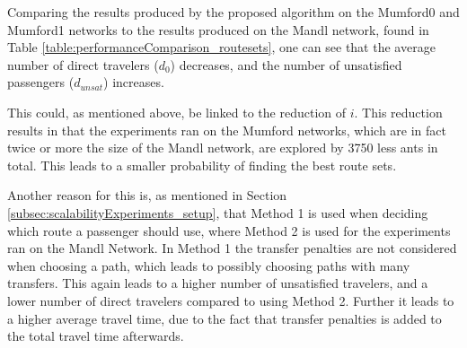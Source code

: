 Comparing the results produced by the proposed algorithm on the Mumford0 and Mumford1 networks to the results produced on the Mandl network, found in Table \vref{table:performanceComparison_routesets}, one can see that the average number of direct travelers ($d_0$) decreases, and the number of unsatisfied passengers ($d_{unsat}$) increases. 

This could, as mentioned above, be linked to the reduction of $i$. This reduction results in that the experiments ran on the Mumford networks, which are in fact twice or more the size of the Mandl network, are explored by 3750 less ants in total. This leads to a smaller probability of finding the best route sets.

Another reason for this is, as mentioned in Section \vref{subsec:scalabilityExperiments_setup}, that Method 1 is used when deciding which route a passenger should use, where Method 2 is used for the experiments ran on the Mandl Network. In Method 1 the transfer penalties are not considered when choosing a path, which leads to possibly choosing paths with many transfers. This again leads to a higher number of unsatisfied travelers, and a lower number of direct travelers compared to using Method 2. Further it leads to a higher average travel time, due to the fact that transfer penalties is added to the total travel time afterwards. 


